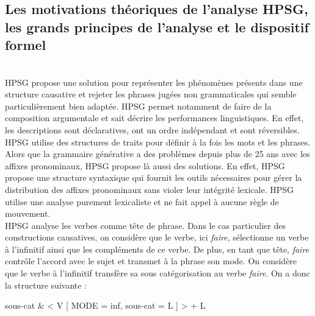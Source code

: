 \subsection{Les motivations théoriques de l'analyse HPSG, les grands principes de l'analyse et le dispositif formel}
	\\
	HPSG propose une solution pour représenter les phénomènes présents dans une structure causative et rejeter les
	phrases jugées non grammaticales qui semble particulièrement bien adaptée. HPSG permet notamment de faire de la composition
	argumentale et sait décrire les performances linguistiques. En effet, les descriptions sont déclaratives, ont un ordre
	indépendant  et sont réversibles. HPSG utilise des structures de traits pour définir à la fois les mots et les phrases.
	Alors que la grammaire générative a des problèmes depuis plus de 25 ans avec les affixes pronominaux, HPSG propose là aussi
	des solutions. En effet, HPSG  propose une structure syntaxique qui fournit les outils nécessaires pour gérer la distribution
	des affixes pronominaux sans violer leur intégrité lexicale. HPSG utilise une analyse purement lexicaliste et ne fait appel 
	à aucune règle de mouvement.
	\\
	HPSG  analyse les verbes comme tête de phrase. Dans le cas particulier des constructions causatives, on considère que le
	verbe, ici \emph{faire}, sélectionne un verbe à l'infinitif ainsi que les compléments de ce verbe. De plus, en tant que 
	tête, \emph{faire} contrôle l'accord avec le sujet et transmet à la phrase son mode. On considère que le verbe à l'infinitif 
	transfère sa sous catégorisation au verbe \emph{faire}. On a donc la structure suivante : 
	\\	
\begin{avm}
			sous-cat  & < V [ MODE = inf, sous-cat = L ] > + L
			
\end{avm}
